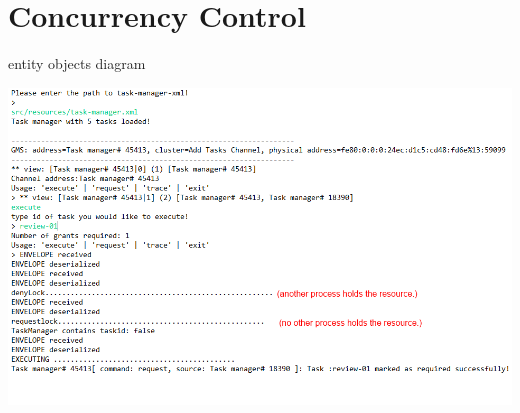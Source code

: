 \chapter{Concurrency Control}



\begin{center}
\centering
\caption{entity objects diagram}
\includegraphics[scale=0.6]{images/Concurrency_run.png}
\end{center}
\vspace{10pt}
